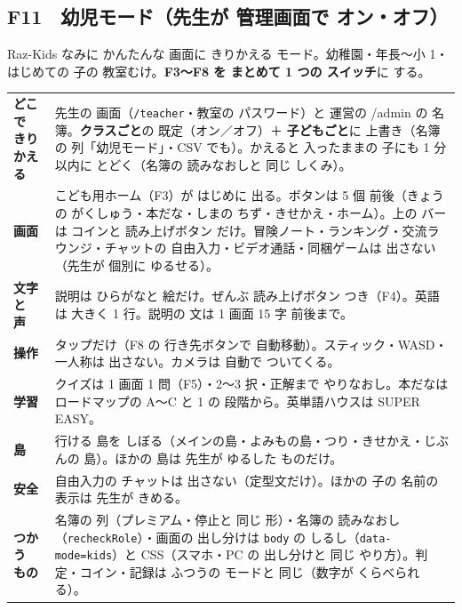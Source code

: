 \documentclass[a4paper,10pt]{article}
\begin{document}
\subsection{F11　幼児モード（先生が 管理画面で オン・オフ）}
Raz-Kids なみに かんたんな 画面に きりかえる モード。幼稚園・年長〜小 1・はじめての 子の 教室むけ。\textbf{F3〜F8 を まとめて 1 つの スイッチ}に する。
\begin{longtable}{@{}L{34mm}L{136mm}@{}}
\toprule
\textbf{どこで きりかえる} & 先生の 画面（\texttt{/teacher}・教室の パスワード）と 運営の /admin の 名簿。\textbf{クラスごと}の 既定（オン／オフ）＋ \textbf{子どもごと}に 上書き（名簿の 列「幼児モード」・CSV でも）。かえると 入ったままの 子にも 1 分以内に とどく（名簿の 読みなおしと 同じ しくみ）。\\
\textbf{画面} & こども用ホーム（F3）が はじめに 出る。ボタンは 5 個 前後（きょうの がくしゅう・本だな・しまの ちず・きせかえ・ホーム）。上の バーは コインと 読み上げボタン だけ。冒険ノート・ランキング・交流ラウンジ・チャットの 自由入力・ビデオ通話・同梱ゲームは 出さない（先生が 個別に ゆるせる）。\\
\textbf{文字と 声} & 説明は ひらがなと 絵だけ。ぜんぶ 読み上げボタン つき（F4）。英語は 大きく 1 行。説明の 文は 1 画面 15 字 前後まで。\\
\textbf{操作} & タップだけ（F8 の 行き先ボタンで 自動移動）。スティック・WASD・一人称は 出さない。カメラは 自動で ついてくる。\\
\textbf{学習} & クイズは 1 画面 1 問（F5）・2〜3 択・正解まで やりなおし。本だなは ロードマップの A〜C と 1 の 段階から。英単語ハウスは SUPER EASY。\\
\textbf{島} & 行ける 島を しぼる（メインの島・よみもの島・つり・きせかえ・じぶんの 島）。ほかの 島は 先生が ゆるした ものだけ。\\
\textbf{安全} & 自由入力の チャットは 出さない（定型文だけ）。ほかの 子の 名前の 表示は 先生が きめる。\\
\textbf{つかう もの} & 名簿の 列（プレミアム・停止と 同じ 形）・名簿の 読みなおし（\texttt{recheckRole}）・画面の 出し分けは \texttt{body} の しるし（\texttt{data-mode=kids}）と CSS（スマホ・PC の 出し分けと 同じ やり方）。判定・コイン・記録は ふつうの モードと 同じ（数字が くらべられる）。\\
\bottomrule
\end{longtable}
\end{document}
